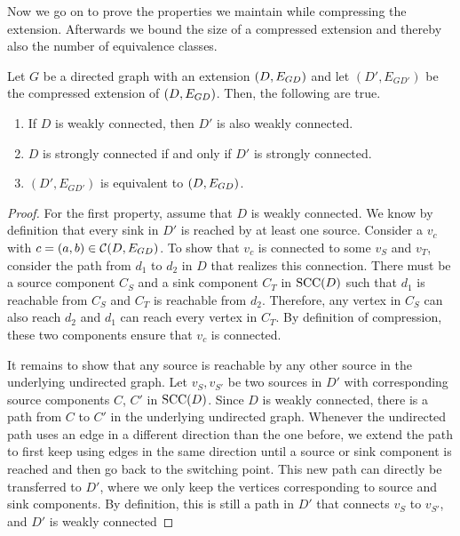 \begin{theorem}
\begin{lemma}
\begin{theorem}
Now we go on to prove the properties we maintain while compressing the extension. Afterwards we bound the size of a compressed extension and thereby also the number of equivalence classes.
\begin{lemma}
\label{lem:comp_weakly_conn_equiv}
  Let $G$ be a directed graph with an extension $({D}, E_{{G}{D}})$ and let $(D', E_{GD'})$ be the compressed extension of $({D}, E_{{G}{D}})$. 
  Then, the following are true.
  \begin{enumerate}
      \item If $D$ is weakly connected, then $D'$ is also weakly connected. 
      \item $D$ is strongly connected if and only if $D'$ is strongly connected.
      \item $(D', E_{GD'})$ is equivalent to $({D}, E_{{G}{D}})$. 
  \end{enumerate}
\end{lemma} 
\begin{proof}
  For the first property, assume that $D$ is weakly connected.
  We know by definition that every sink in $D'$ is reached by at least one source.
  Consider a $v_c$ with $c = (a,b) \in \operatorname{\mathcal{C}}({D,E_{{G}{D}}})$. To show that $v_c$ is connected to some $v_S$ and $v_T$, consider the path from $d_1$ to $d_2$ in $D$ that realizes this connection. There must be a source component $C_S$ and a sink component $C_T$ in $\operatorname{\textrm{SCC}}({D})$ such that $d_1$ is reachable from $C_S$ and $C_T$ is reachable from $d_2$. Therefore, any vertex in $C_S$ can also reach $d_2$ and $d_1$ can reach every vertex in $C_T$. By definition of compression, these two components ensure that $v_c$ is connected. 
  
  It remains to show that any source is reachable by any other source in the underlying undirected graph. Let $v_S, v_{S'}$ be two sources in $D'$ with corresponding source components $C$, $C'$ in $\operatorname{\textrm{SCC}}({D})$. Since $D$ is weakly connected, there is a path from $C$ to $C'$ in the underlying undirected graph. Whenever the undirected path uses an edge in a different direction than the one before, we extend the path to first keep using edges in the same direction until a source or sink component is reached and then go back to the switching point. This new path can directly be transferred to $D'$, where we only keep the vertices corresponding to source and sink components. By definition, this is still a path in $D'$ that connects $v_S$ to $v_{S'}$, and $D'$ is weakly connected


\end{proof}
\end{theorem}
\end{lemma}
\end{theorem}
